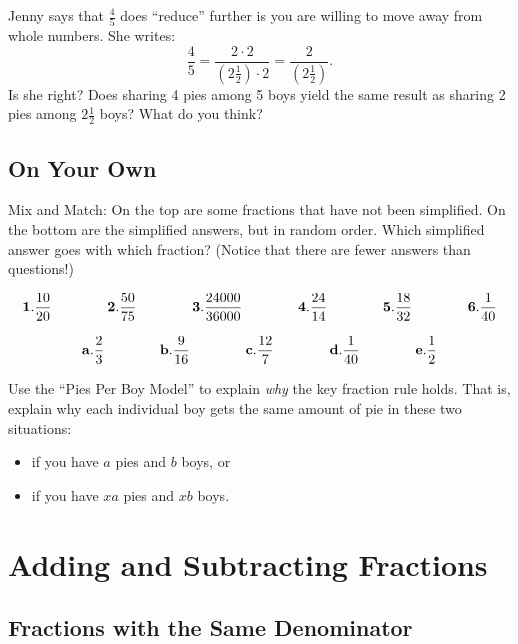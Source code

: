  \begin{thinkpair*}
 Jenny says that $\frac 4 5$
does ``reduce'' further is you are willing to move
away from whole numbers. She writes:
 \[
 \frac{4}{5} = 
 \frac{2\cdot 2}{\left(2\frac 1 2\right) \cdot 2}=
 \frac{2}{\left(2\frac 1 2\right)}.
 \]
Is she right? Does sharing 4 pies among 5 boys yield the same result as sharing 2
pies among $2\frac 1 2$ boys?
What do you think?
 
 \end{thinkpair*}
 


\subsection*{On Your Own}
Mix and Match: On the top are some fractions that have not
been simplified. On the bottom are the simplified answers, but in random order.
Which simplified answer goes with which fraction? (Notice that there are fewer
answers than questions!)

\[
{\bf 1.} \frac{10}{20} 
\qquad\qquad
{\bf 2.} \frac{50}{75} 
\qquad\qquad
{\bf 3.} \frac{24000}{36000} 
\qquad\qquad
{\bf 4.} \frac{24}{14} 
\qquad\qquad
{\bf 5.} \frac{18}{32} 
\qquad\qquad
{\bf 6.} \frac{1}{40} 
\]

\[
{\bf a.} \frac{2}{3} 
\qquad\qquad
{\bf b.} \frac{9}{16} 
\qquad\qquad
{\bf c.} \frac{12}{7} 
\qquad\qquad
{\bf d.} \frac{1}{40} 
\qquad\qquad
{\bf e.} \frac{1}{2} 
\]


\begin{thinkpair*}
Use the ``Pies Per Boy Model'' to explain \emph{why} the key fraction rule holds.  That is, explain why each individual boy gets the same amount of pie in these two situations:
\begin{itemize}
\item
 if you have $a$ pies and $b$ boys, or
 \item
  if you have $xa$ pies and $xb$ boys.
  \end{itemize}
\end{thinkpair*}





\section{Adding and Subtracting Fractions}

\subsection{Fractions with the Same Denominator}

